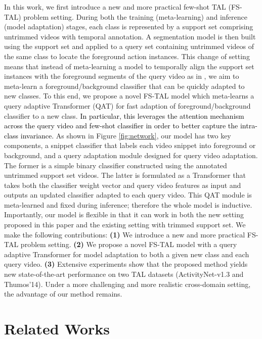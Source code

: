 \documentclass{bmvc2k}
\newcommand{\xz}[1]{\textcolor{black}{{#1}}}
\begin{document}
In this work, we first introduce a new and more practical few-shot TAL (FS-TAL) problem setting.
During both the training (meta-learning) and inference (model adaptation) stages, each class is represented by a support set comprising untrimmed videos with temporal annotation. A segmentation model is then built using the support set and applied to a query set containing untrimmed videos of the same class to locate the foreground action instances. This change of setting means that instead of meta-learning a model to temporally align the support set instances with the foreground segments of the query video as in \cite{yang2018one,yang2020localizing,zhang2020metal}, we aim to meta-learn a foreground/background classifier that can be quickly adapted to new classes.
To this end,
we propose a novel FS-TAL model which meta-learns a query adaptive Transformer (QAT) for fast adaption of foreground/background classifier to a new class.
\xz{In particular, this leverages the attention mechanism across the query video and few-shot classifier in order to better capture the intra-class invariance.}
As shown in Figure \ref{fig:network}, our model has two key components, 
a snippet classifier that labels each video snippet into foreground or background, and a query adaptation module designed for query video adaptation.  
The former is a simple binary classifier constructed using the annotated untrimmed support set videos. The latter is formulated as a Transformer that takes both the classifier weight vector and query video features as input and outputs an updated classifier adapted to each query video. This QAT module is meta-learned and fixed during inference; therefore the whole model is inductive. Importantly, our model is flexible 
in that it can work in both the new setting proposed in this paper and the existing setting with trimmed support set.
We make the following contributions:
{\bf (1)}
We introduce a new and more practical FS-TAL problem setting.
{\bf (2)}
We propose a novel FS-TAL model with a query adaptive Transformer for model adaptation to both a given new class and each query video.
{\bf (3)}
Extensive experiments show that the proposed method yields new state-of-the-art performance on two TAL datasets (ActivityNet-v1.3 and Thumos'14).
Under a more challenging and more realistic cross-domain setting, the advantage of our method remains.
\vspace{-0.2in}
\section{Related Works}
\end{document}
